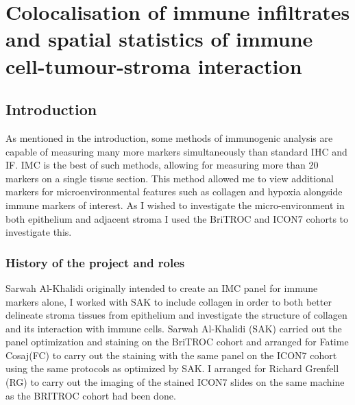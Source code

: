 
\chapter{Colocalisation of immune infiltrates and spatial statistics of immune cell-tumour-stroma interaction}

\ifpdf
    \graphicspath{{Chapter4/Figs/Raster/}{Chapter4/Figs/PDF/}{Chapter4/Figs/}}
\else
    \graphicspath{{Chapter4/Figs/Vector/}{Chapter4/Figs/}}
\fi


\section[Introduction]{Introduction}

As mentioned in the introduction, some methods of immunogenic analysis are capable of measuring many more markers simultaneously than standard IHC and IF. IMC is the best of such methods, allowing for measuring more than 20 markers on a single tissue section. This method allowed me to view additional markers for microenvironmental features such as collagen and hypoxia alongside immune markers of interest. As I wished to investigate the micro-environment in both epithelium and adjacent stroma I used the BriTROC and ICON7 cohorts to investigate this.

\subsection{History of the project and roles}
Sarwah Al-Khalidi originally intended to create an IMC panel for immune markers alone, I worked with SAK to include collagen in order to both better delineate stroma tissues from epithelium and investigate the structure of collagen and its interaction with immune cells. Sarwah Al-Khalidi (SAK) carried out the panel optimization and staining on the BriTROC cohort and arranged for Fatime Cosaj(FC) to carry out the staining with the same panel on the ICON7 cohort using the same protocols as optimized by SAK. I arranged for Richard Grenfell (RG) to carry out the imaging of the stained ICON7 slides on the same machine as the BRITROC cohort had been done.

